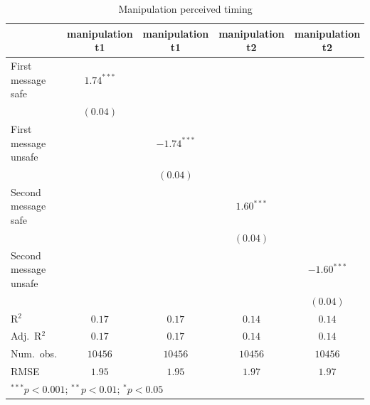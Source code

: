 
\begin{table}
\begin{center}
\begin{tabular}{l c c c c}
\hline
 & manipulation t1 & manipulation t1 & manipulation t2 & manipulation t2 \\
\hline
First message safe    & $1.74^{***}$ &               &              &               \\
                      & $(0.04)$     &               &              &               \\
First message unsafe  &              & $-1.74^{***}$ &              &               \\
                      &              & $(0.04)$      &              &               \\
Second message safe   &              &               & $1.60^{***}$ &               \\
                      &              &               & $(0.04)$     &               \\
Second message unsafe &              &               &              & $-1.60^{***}$ \\
                      &              &               &              & $(0.04)$      \\
\hline
R$^2$                 & $0.17$       & $0.17$        & $0.14$       & $0.14$        \\
Adj.\ R$^2$           & $0.17$       & $0.17$        & $0.14$       & $0.14$        \\
Num.\ obs.            & $10456$      & $10456$       & $10456$      & $10456$       \\
RMSE                  & $1.95$       & $1.95$        & $1.97$       & $1.97$        \\
\hline
\multicolumn{5}{l}{\scriptsize{$^{***}p<0.001$; $^{**}p<0.01$; $^{*}p<0.05$}}
\end{tabular}
\caption{Manipulation perceived timing}
\label{table:timing}
\end{center}
\end{table}


